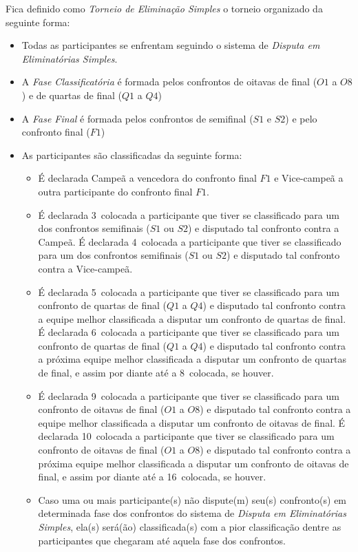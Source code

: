 \noindent
Fica definido como \textit{Torneio de Eliminação Simples} o torneio organizado da seguinte forma:
\begin{itemize}[noitemsep]
	\item Todas as participantes se enfrentam seguindo o sistema de \textit{Disputa em Eliminatórias Simples}.
	\item A \textit{Fase Classificatória} é formada pelos confrontos de oitavas de final ($O1$ a $O8$) e de quartas de final ($Q1$ a $Q4$)
	\item A \textit{Fase Final} é formada pelos confrontos de semifinal ($S1$ e $S2$) e pelo confronto final ($F1$)
	\item As participantes são classificadas da seguinte forma:
	\begin{itemize}[noitemsep]
		\item É declarada Campeã a vencedora do confronto final $F1$ e Vice-campeã a outra participante do confronto final $F1$.
		\item É declarada 3\ula\ colocada a participante que tiver se classificado para um dos confrontos semifinais ($S1$ ou $S2$) e disputado tal confronto contra a Campeã. É declarada 4\ula\ colocada a participante que tiver se classificado para um dos confrontos semifinais ($S1$ ou $S2$) e disputado tal confronto contra a Vice-campeã.
		\item É declarada 5\ula\ colocada a participante que tiver se classificado para um confronto de quartas de final ($Q1$ a $Q4$) e disputado tal confronto contra a equipe melhor classificada a disputar um confronto de quartas de final. É declarada 6\ula\ colocada a participante que tiver se classificado para um confronto de quartas de final ($Q1$ a $Q4$) e disputado tal confronto contra a próxima equipe melhor classificada a disputar um confronto de quartas de final, e assim por diante até a 8\ula\ colocada, se houver.
		\item É declarada 9\ula\ colocada a participante que tiver se classificado para um confronto de oitavas de final ($O1$ a $O8$) e disputado tal confronto contra a equipe melhor classificada a disputar um confronto de oitavas de final. É declarada 10\ula\ colocada a participante que tiver se classificado para um confronto de oitavas de final ($O1$ a $O8$) e disputado tal confronto contra a próxima equipe melhor classificada a disputar um confronto de oitavas de final, e assim por diante até a 16\ula\ colocada, se houver.
		\item Caso uma ou mais participante(s) não dispute(m) seu(s) confronto(s) em determinada fase dos confrontos do sistema de \textit{Disputa em Eliminatórias Simples}, ela(s) será(ão) classificada(s) com a pior classificação dentre as participantes que chegaram até aquela fase dos confrontos.
	\end{itemize}
\end{itemize}

